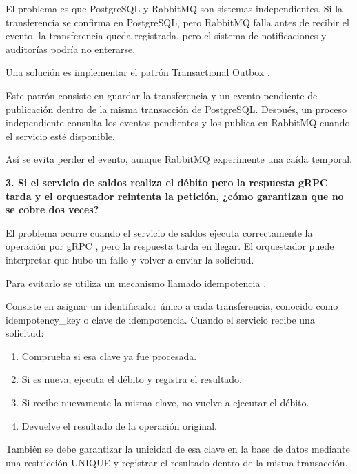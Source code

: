 \documentclass[12pt, a4paper]{article}
\begin{document}
El problema es que PostgreSQL y RabbitMQ son sistemas independientes. Si la transferencia se confirma en PostgreSQL, pero RabbitMQ falla antes de recibir el evento, la transferencia queda registrada, pero el sistema de notificaciones y auditorías podría no enterarse.

Una solución es implementar el patrón Transactional Outbox \cite{newman2021}.

Este patrón consiste en guardar la transferencia y un evento pendiente de publicación dentro de la misma transacción de PostgreSQL. Después, un proceso independiente consulta los eventos pendientes y los publica en RabbitMQ cuando el servicio esté disponible.

Así se evita perder el evento, aunque RabbitMQ experimente una caída temporal.

\vspace{0.4cm}

\textbf{3. Si el servicio de saldos realiza el débito pero la respuesta gRPC tarda y el orquestador reintenta la petición, ¿cómo garantizan que no se cobre dos veces?}

El problema ocurre cuando el servicio de saldos ejecuta correctamente la operación por gRPC \cite{buzhin2023}, pero la respuesta tarda en llegar. El orquestador puede interpretar que hubo un fallo y volver a enviar la solicitud.

Para evitarlo se utiliza un mecanismo llamado idempotencia \cite{newman2021}.

Consiste en asignar un identificador único a cada transferencia, conocido como idempotency\_key o clave de idempotencia. Cuando el servicio recibe una solicitud:

\begin{enumerate}[leftmargin=1.5cm]
    \item Comprueba si esa clave ya fue procesada.
    \item Si es nueva, ejecuta el débito y registra el resultado.
    \item Si recibe nuevamente la misma clave, no vuelve a ejecutar el débito.
    \item Devuelve el resultado de la operación original.
\end{enumerate}

También se debe garantizar la unicidad de esa clave en la base de datos mediante una restricción UNIQUE y registrar el resultado dentro de la misma transacción.
\end{document}
